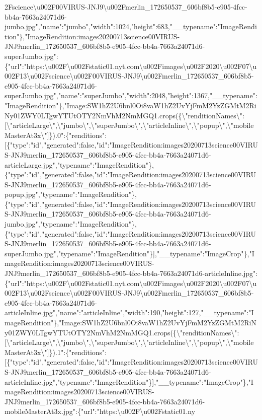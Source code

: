 2Fscience\textbackslash{}u002F00VIRUS-JNJ9\textbackslash{}u002Fmerlin\_172650537\_606bf8b5-e905-4fcc-bb4a-7663a24071d6-jumbo.jpg","name":"jumbo","width":1024,"height":683,"\_\_typename":"ImageRendition"\},"ImageRendition:images20200713science00VIRUS-JNJ9merlin\_172650537\_606bf8b5-e905-4fcc-bb4a-7663a24071d6-superJumbo.jpg":\{"url":"https:\textbackslash{}u002F\textbackslash{}u002Fstatic01.nyt.com\textbackslash{}u002Fimages\textbackslash{}u002F2020\textbackslash{}u002F07\textbackslash{}u002F13\textbackslash{}u002Fscience\textbackslash{}u002F00VIRUS-JNJ9\textbackslash{}u002Fmerlin\_172650537\_606bf8b5-e905-4fcc-bb4a-7663a24071d6-superJumbo.jpg","name":"superJumbo","width":2048,"height":1367,"\_\_typename":"ImageRendition"\},"Image:SW1hZ2U6bnl0Oi8vaW1hZ2UvYjFmM2YzZGMtM2RiNy01ZWY0LTgwYTUtOTY2NmVhM2NmMGQ1.crops(\{\textbackslash{}"renditionNames\textbackslash{}":{[}\textbackslash{}"articleLarge\textbackslash{}",\textbackslash{}"jumbo\textbackslash{}",\textbackslash{}"superJumbo\textbackslash{}",\textbackslash{}"articleInline\textbackslash{}",\textbackslash{}"popup\textbackslash{}",\textbackslash{}"mobileMasterAt3x\textbackslash{}"{]}\}).0":\{"renditions":{[}\{"type":"id","generated":false,"id":"ImageRendition:images20200713science00VIRUS-JNJ9merlin\_172650537\_606bf8b5-e905-4fcc-bb4a-7663a24071d6-articleLarge.jpg","typename":"ImageRendition"\},\{"type":"id","generated":false,"id":"ImageRendition:images20200713science00VIRUS-JNJ9merlin\_172650537\_606bf8b5-e905-4fcc-bb4a-7663a24071d6-popup.jpg","typename":"ImageRendition"\},\{"type":"id","generated":false,"id":"ImageRendition:images20200713science00VIRUS-JNJ9merlin\_172650537\_606bf8b5-e905-4fcc-bb4a-7663a24071d6-jumbo.jpg","typename":"ImageRendition"\},\{"type":"id","generated":false,"id":"ImageRendition:images20200713science00VIRUS-JNJ9merlin\_172650537\_606bf8b5-e905-4fcc-bb4a-7663a24071d6-superJumbo.jpg","typename":"ImageRendition"\}{]},"\_\_typename":"ImageCrop"\},"ImageRendition:images20200713science00VIRUS-JNJ9merlin\_172650537\_606bf8b5-e905-4fcc-bb4a-7663a24071d6-articleInline.jpg":\{"url":"https:\textbackslash{}u002F\textbackslash{}u002Fstatic01.nyt.com\textbackslash{}u002Fimages\textbackslash{}u002F2020\textbackslash{}u002F07\textbackslash{}u002F13\textbackslash{}u002Fscience\textbackslash{}u002F00VIRUS-JNJ9\textbackslash{}u002Fmerlin\_172650537\_606bf8b5-e905-4fcc-bb4a-7663a24071d6-articleInline.jpg","name":"articleInline","width":190,"height":127,"\_\_typename":"ImageRendition"\},"Image:SW1hZ2U6bnl0Oi8vaW1hZ2UvYjFmM2YzZGMtM2RiNy01ZWY0LTgwYTUtOTY2NmVhM2NmMGQ1.crops(\{\textbackslash{}"renditionNames\textbackslash{}":{[}\textbackslash{}"articleLarge\textbackslash{}",\textbackslash{}"jumbo\textbackslash{}",\textbackslash{}"superJumbo\textbackslash{}",\textbackslash{}"articleInline\textbackslash{}",\textbackslash{}"popup\textbackslash{}",\textbackslash{}"mobileMasterAt3x\textbackslash{}"{]}\}).1":\{"renditions":{[}\{"type":"id","generated":false,"id":"ImageRendition:images20200713science00VIRUS-JNJ9merlin\_172650537\_606bf8b5-e905-4fcc-bb4a-7663a24071d6-articleInline.jpg","typename":"ImageRendition"\}{]},"\_\_typename":"ImageCrop"\},"ImageRendition:images20200713science00VIRUS-JNJ9merlin\_172650537\_606bf8b5-e905-4fcc-bb4a-7663a24071d6-mobileMasterAt3x.jpg":\{"url":"https:\textbackslash{}u002F\textbackslash{}u002Fstatic01.ny